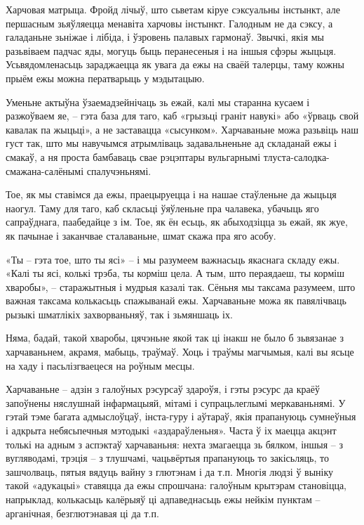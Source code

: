 Харчовая матрыца. Фройд лічыў, што сьветам кіруе сэксуальны інстынкт, але першасным зьяўляецца менавіта харчовы інстынкт. Галодным не да сэксу, а галаданьне зьніжае і лібіда, і ўзровень палавых гармонаў. Звычкі, якія мы разьвіваем падчас яды, могуць быць перанесеныя і на іншыя сфэры жыцьця. Усьвядомленасьць зараджаецца як увага да ежы на сваёй талерцы, таму кожны прыём ежы можна ператварыць у мэдытацыю.

Уменьне актыўна ўзаемадзейнічаць зь ежай, калі мы старанна кусаем і разжоўваем яе, – гэта база для таго, каб «грызьці граніт навукі» або «ўрваць свой кавалак па жыцьці», а не заставацца «сысунком». Харчаваньне можа разьвіць наш густ так, што мы навучымся атрымліваць задавальненьне ад складанай ежы і смакаў, а ня проста бамбаваць свае рэцэптары вульгарнымі тлуста-салодка-смажана-салёнымі спалучэньнямі.

Тое, як мы ставімся да ежы, праецыруецца і на нашае стаўленьне да жыцьця наогул. Таму для таго, каб скласьці ўяўленьне пра чалавека, убачыць яго сапраўднага, паабедайце з ім. Тое, як ён есьць, як абыходзіцца зь ежай, як жуе, як пачынае і заканчвае сталаваньне, шмат скажа пра яго асобу.

«Ты – гэта тое, што ты ясі» – і мы разумеем важнасьць якаснага складу ежы. «Калі ты ясі, колькі трэба, ты корміш цела. А тым, што пераядаеш, ты корміш хваробы», – старажытныя і мудрыя казалі так. Сёньня мы таксама разумеем, што важная таксама колькасьць спажыванай ежы. Харчаваньне можа як павялічваць рызыкі шматлікіх захворваньняў, так і зьмяншаць іх.

Няма, бадай, такой хваробы, цячэньне якой так ці інакш не было б зьвязанае з харчаваньнем, акрамя, мабыць, траўмаў. Хоць і траўмы магчымыя, калі вы ясьце на хаду і пасьлізгваецеся на роўным месцы.

Харчаваньне – адзін з галоўных рэсурсаў здароўя, і гэты рэсурс да краёў запоўнены няслушнай інфармацыяй, мітамі і супрацьлеглымі меркаваньнямі. У гэтай тэме багата адмыслоўцаў, інста-гуру і аўтараў, якія прапануюць сумнеўныя і адкрыта небясьпечныя мэтодыкі «аздараўленьня». Часта ў іх маецца акцэнт толькі на адным з аспэктаў харчаваньня: нехта змагаецца зь бялком, іншыя – з вугляводамі, трэція – з тлушчамі, чацьвёртыя прапануюць то закісьляць, то зашчолваць, пятыя вядуць вайну з глютэнам і да т.п. Многія людзі ў выніку такой «адукацыі» ставяцца да ежы спрошчана: галоўным крытэрам становіцца, напрыклад, колькасьць калёрыяў ці адпаведнасьць ежы нейкім пунктам – арганічная, безглютэнавая ці да т.п.

